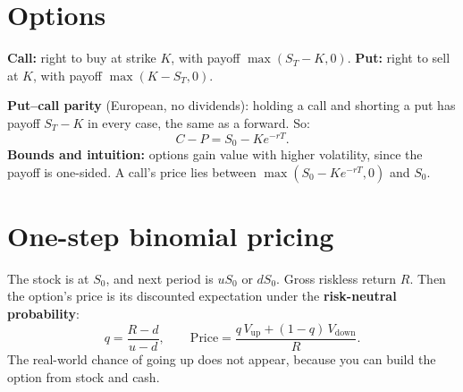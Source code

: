 \documentclass[11pt,a4paper,openany]{report}
\begin{document}
\section{Options}
\begin{center}
\quad
{}
\end{center}
\textbf{Call:} right to buy at strike $K$, with payoff $\max(S_T-K,0)$. \textbf{Put:} right to sell at $K$, with payoff $\max(K-S_T,0)$.

\textbf{Put--call parity} (European, no dividends): holding a call and shorting a put has payoff $S_T-K$ in every case, the same as a forward. So:
\[C-P=S_0-Ke^{-rT}.\]
\textbf{Bounds and intuition:} options gain value with higher volatility, since the payoff is one-sided. A call's price lies between $\max(S_0-Ke^{-rT},0)$ and $S_0$.

\section{One-step binomial pricing}
\begin{idea}
The stock is at $S_0$, and next period is $uS_0$ or $dS_0$. Gross riskless return $R$. Then the option's price is its discounted expectation under the \textbf{risk-neutral probability}:
\[q=\frac{R-d}{u-d},\qquad\text{Price}=\frac{q\,V_{\text{up}}+(1-q)\,V_{\text{down}}}{R}.\]
The real-world chance of going up does not appear, because you can build the option from stock and cash.
\end{idea}
\end{document}
